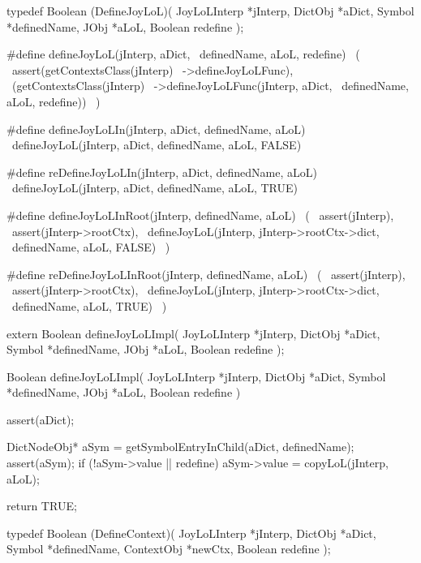 \startCHeader
typedef Boolean (DefineJoyLoL)(
  JoyLoLInterp *jInterp,
  DictObj      *aDict,
  Symbol       *definedName,
  JObj         *aLoL,
  Boolean       redefine
);

#define defineJoyLoL(jInterp, aDict,      \
  definedName, aLoL, redefine)            \
  (                                       \
    assert(getContextsClass(jInterp)      \
      ->defineJoyLoLFunc),                \
    (getContextsClass(jInterp)            \
      ->defineJoyLoLFunc(jInterp, aDict,  \
        definedName, aLoL, redefine))     \
  )

#define defineJoyLoLIn(jInterp, aDict, definedName, aLoL) \
  defineJoyLoL(jInterp, aDict, definedName, aLoL, FALSE)

#define reDefineJoyLoLIn(jInterp, aDict, definedName, aLoL) \
  defineJoyLoL(jInterp, aDict, definedName, aLoL, TRUE)

#define defineJoyLoLInRoot(jInterp, definedName, aLoL)  \
  (                                                     \
    assert(jInterp),                                    \
    assert(jInterp->rootCtx),                           \
    defineJoyLoL(jInterp, jInterp->rootCtx->dict,       \
      definedName, aLoL, FALSE)                         \
  )

#define reDefineJoyLoLInRoot(jInterp, definedName, aLoL)  \
  (                                                       \
    assert(jInterp),                                      \
    assert(jInterp->rootCtx),                             \
    defineJoyLoL(jInterp, jInterp->rootCtx->dict,         \
      definedName, aLoL, TRUE)                            \
  )
\stopCHeader

\setCHeaderStream{private}
\startCHeader
extern Boolean defineJoyLoLImpl(
  JoyLoLInterp *jInterp,
  DictObj      *aDict,
  Symbol       *definedName,
  JObj         *aLoL,
  Boolean       redefine
);
\stopCHeader
\setCHeaderStream{public}

\startCCode
Boolean defineJoyLoLImpl(
  JoyLoLInterp *jInterp,
  DictObj      *aDict,
  Symbol       *definedName,
  JObj         *aLoL,
  Boolean       redefine
) {
  assert(aDict);
  
  DictNodeObj* aSym = getSymbolEntryInChild(aDict, definedName);
  assert(aSym);
  if (!aSym->value || redefine) {
    aSym->value = copyLoL(jInterp, aLoL);
  }

  return TRUE;
}
\stopCCode

\startCHeader
typedef Boolean (DefineContext)(
  JoyLoLInterp *jInterp,
  DictObj      *aDict,
  Symbol       *definedName,
  ContextObj   *newCtx,
  Boolean       redefine
);


